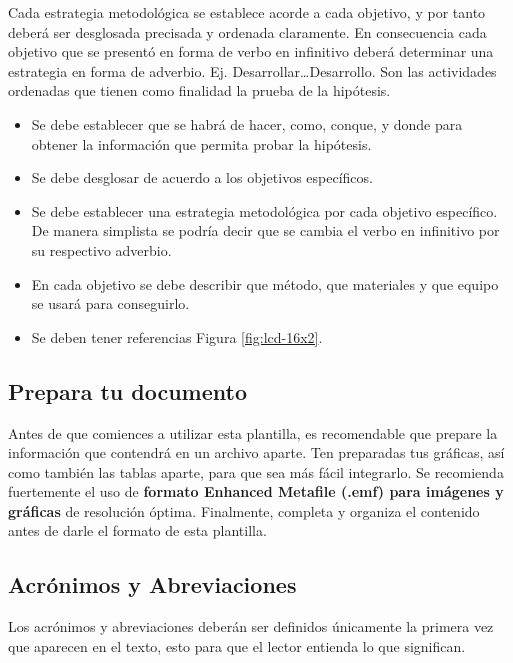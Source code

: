     
    Cada estrategia metodológica se establece acorde a cada objetivo, y por tanto deberá ser desglosada precisada y ordenada claramente. En consecuencia cada objetivo que se presentó en forma de verbo en infinitivo deberá determinar una estrategia en forma de adverbio. Ej. Desarrollar…Desarrollo. Son las actividades ordenadas que tienen como finalidad la prueba de la hipótesis. 
    
    \begin{itemize}
        \item Se debe establecer que se habrá de hacer, como, conque, y donde para obtener la información que permita probar la hipótesis.  
        \item Se debe desglosar de acuerdo a los objetivos específicos. 
        \item Se debe establecer una estrategia metodológica por cada objetivo específico. De manera simplista se podría decir que se cambia el verbo en infinitivo por su respectivo adverbio.
        \item En cada objetivo se debe describir que método, que materiales y que equipo se usará para conseguirlo.
        \item Se deben tener referencias Figura \ref{fig:lcd-16x2}.
    \end{itemize}
    
    \subsection{Prepara tu documento}
    
    Antes de que comiences a utilizar esta plantilla, es recomendable que prepare la información que contendrá en un archivo aparte. 
    Ten preparadas tus gráficas, así como también las tablas aparte, para que sea más fácil integrarlo. 
    Se recomienda fuertemente el uso de \textbf{formato Enhanced Metafile (.emf) para imágenes y gráficas} de resolución óptima. 
    Finalmente, completa y organiza el contenido antes de darle el formato de esta plantilla. 
    
    \subsection{Acrónimos y Abreviaciones}
    
    Los acrónimos y abreviaciones deberán ser definidos únicamente la primera vez que aparecen en el texto, esto para que el lector entienda lo que significan.
    
